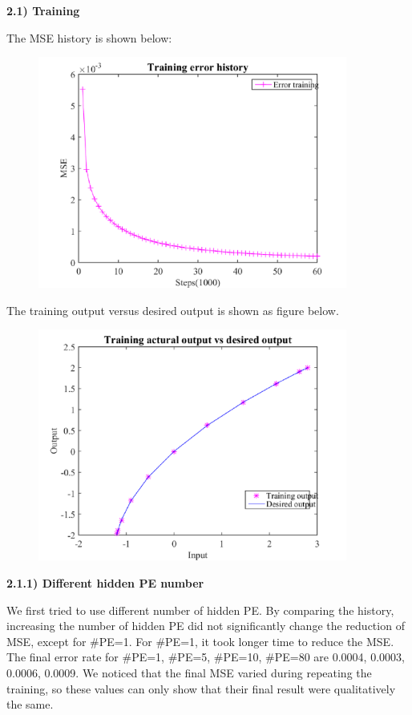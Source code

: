 \documentclass[epsfig]{article}
\def\bpar{\vskip26pt}
\def\npar{\vskip13pt}
\begin{document}
{\bf 
\npar
2.1) Training
\bpar
}
 

The MSE history is shown below:

\begin{figure}[H] 
\centering\includegraphics[width=4in]{MSEhistory_1.png} 
\end{figure} 

The training output versus desired output is shown as figure below.

\begin{figure}[H] 
\centering\includegraphics[width=4in]{TrainvsDesire_1.png} 
\end{figure} 


{\bf 
\npar
2.1.1) Different hidden PE number
\bpar
}

We first tried to use different number of hidden PE. By comparing the history, increasing the number of hidden PE did not significantly change the reduction of MSE, except for $\#$PE=1. For $\#$PE=1, it took longer time to reduce the MSE. The final error rate for $\#$PE=1, $\#$PE=5, $\#$PE=10, $\#$PE=80 are  0.0004, 0.0003, 0.0006, 0.0009. We noticed that the final MSE varied during repeating the training, so these values can only show that their final result were qualitatively the same.
\end{document}
